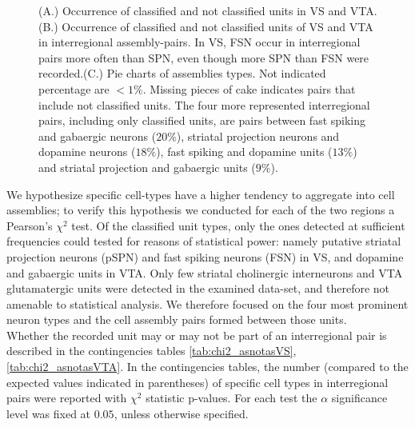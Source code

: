\begin{figure}[H]
    \caption{(A.) Occurrence of classified and not classified units in VS and VTA. (B.) Occurrence of classified and not classified units of VS and VTA in interregional assembly-pairs. In VS, FSN occur in interregional pairs more often than SPN, even though more SPN than FSN were recorded.(C.) Pie charts of assemblies types. Not indicated percentage are $<1\%$. Missing pieces of cake indicates pairs that include not classified units. The four more represented interregional pairs, including only classified units, are pairs between fast spiking and gabaergic neurons ($20\%$), striatal projection neurons and dopamine neurons ($18\%$), fast spiking and dopamine units ($13\%$) and striatal projection and gabaergic units ($9\%$). }
    \label{fig:PieAssembliesTot}
\end{figure}
We hypothesize specific cell-types have a higher tendency to aggregate into cell assemblies; to verify this hypothesis we conducted for each of the two regions a Pearson's $\chi^2$ test. Of the classified unit types, only the ones detected at sufficient frequencies could tested for reasons of statistical power: namely putative striatal projection neurons (pSPN) and fast spiking neurons (FSN) in VS, and dopamine and gabaergic units in VTA. Only few striatal cholinergic interneurons and VTA glutamatergic units were detected in the examined data-set, and therefore not amenable to statistical analysis. We therefore focused on the four most prominent neuron types and the cell assembly pairs formed between those units.\\Whether the recorded unit may or may not be part of an interregional pair is described  in the contingencies tables \ref{tab:chi2_asnotasVS}, \ref{tab:chi2_asnotasVTA}. In the contingencies tables, the number (compared to the expected values indicated in parentheses) of specific cell types in interregional pairs were reported with $\chi^2$ statistic p-values. For each test the $\alpha$ significance level was fixed at $0.05$, unless otherwise specified.\\
